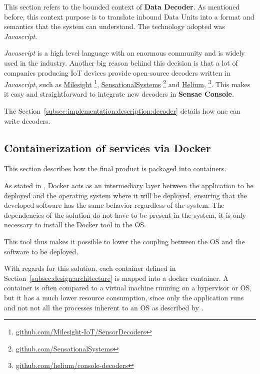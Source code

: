 This section refers to the bounded context of \textbf{Data Decoder}. As mentioned before, this context purpose is to translate inbound Data Units into a format and semantics that the system can understand. The technology adopted was \textit{Javascript}.

\textit{Javascript} is a high level language with an enormous community and is widely used in the industry. Another big reason behind this decision is that a lot of companies producing \gls{IoT} devices provide open-source decoders written in \textit{Javascript}, such as \href{https://github.com/Milesight-IoT/SensorDecoders}{Milesight} \footnote{\href {https://github.com/Milesight-IoT/SensorDecoders}{github.com/Milesight-IoT/SensorDecoders}}, \href{https://github.com/SensationalSystems}{SensationalSystems} \footnote{\href {https://github.com/SensationalSystems}{github.com/SensationalSystems}} and \href{https://github.com/helium/console-decoders}{Helium}, \footnote{\href {https://github.com/helium/console-decoders}{github.com/helium/console-decoders}}. This makes it easy and straightforward to integrate new decoders in \textbf{Sensae Console}.

The Section~\ref{subsec:implementation:description:decoder} details how one can write decoders.

\subsection{Containerization of services via Docker}
\label{subsec:implementation:decisions:docker}

This section describes how the final product is packaged into containers.

As stated in , Docker acts as an intermediary layer between the application to be deployed and the operating system where it will be deployed, ensuring that the developed software has the same behavior regardless of the system. The dependencies of the solution do not have to be present in the system, it is only necessary to install the Docker tool in the \gls{OS}.

This tool thus makes it possible to lower the coupling between the \gls{OS} and the software to be deployed.

With regards for this solution, each container defined in Section~\ref{subsec:design:architecture} is mapped into a docker container.
A container is often compared to a virtual machine running on a hypervisor or \gls{OS}, but it has a much lower resource consumption, since only the application runs and not not all the processes inherent to an \gls{OS} as described by \cite{bernstein2014containers}.

